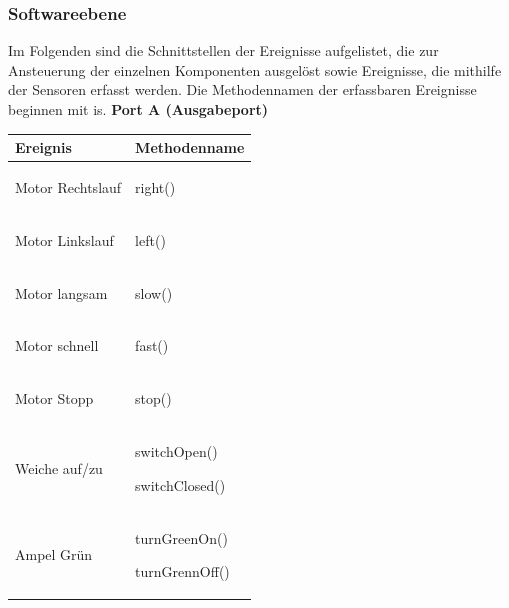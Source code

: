 \documentclass[a4paper, 11pt]{article}
\newcommand{\su}{\glqq} %
\newcommand{\so}{\grqq\xspace} %
\begin{document}
\subsubsection{Softwareebene}
Im Folgenden sind die Schnittstellen der Ereignisse aufgelistet, die zur Ansteuerung der einzelnen Komponenten ausgelöst sowie Ereignisse, die mithilfe der Sensoren erfasst werden. Die Methodennamen der erfassbaren Ereignisse beginnen mit \su is\so. 
\textbf{Port A (Ausgabeport)}
\begin{table}[h]
\center
\begin{tabularx}{\textwidth}{|X|X|}
\hline
\textbf{Ereignis}&\textbf{Methodenname}\\
\hline
Motor Rechtslauf&\begin{compactenum}[]
           \item \ttfamily right()
           \end{compactenum}\\
\hline
Motor Linkslauf&\begin{compactenum}[]
           \item \ttfamily left()
           \end{compactenum}\\
\hline
Motor langsam&\begin{compactenum}[]
           \item \ttfamily slow()
           \end{compactenum}\\
\hline
Motor schnell&\begin{compactenum}[]
           \item \ttfamily fast()
           \end{compactenum}\\
\hline
Motor Stopp&\begin{compactenum}[]
           \item \ttfamily stop()
           \end{compactenum}\\
\hline
Weiche auf/zu&\begin{compactenum}[]
           \item \ttfamily switchOpen()
           \item \ttfamily switchClosed()
           \end{compactenum}\\
\hline
Ampel Grün&\begin{compactenum}[]
           \item \ttfamily turnGreenOn()
           \item \ttfamily turnGrennOff()

\end{compactenum}
\end{tabularx}
\end{table}
\end{document}
